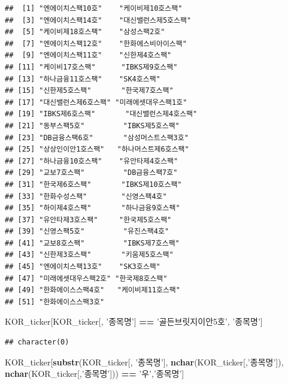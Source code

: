 \documentclass[12pt,]{book}
\newenvironment{Shaded}{\begin{snugshade}}{\end{snugshade}}
\newcommand{\KeywordTok}[1]{\textcolor[rgb]{0.13,0.29,0.53}{\textbf{#1}}}
\newcommand{\NormalTok}[1]{#1}
\newcommand{\OperatorTok}[1]{\textcolor[rgb]{0.81,0.36,0.00}{\textbf{#1}}}
\newcommand{\StringTok}[1]{\textcolor[rgb]{0.31,0.60,0.02}{#1}}
\begin{document}
\begin{verbatim}
##  [1] "엔에이치스팩10호"    "케이비제10호스팩"   
##  [3] "엔에이치스팩14호"    "대신밸런스제5호스팩"
##  [5] "케이비제18호스팩"    "삼성스팩2호"        
##  [7] "엔에이치스팩12호"    "한화에스비아이스팩" 
##  [9] "엔에이치스팩11호"    "신한제4호스팩"      
## [11] "케이비17호스팩"      "IBKS제9호스팩"      
## [13] "하나금융11호스팩"    "SK4호스팩"          
## [15] "신한제5호스팩"       "한국제7호스팩"      
## [17] "대신밸런스제6호스팩" "미래에셋대우스팩1호"
## [19] "IBKS제6호스팩"       "대신밸런스제4호스팩"
## [21] "동부스팩5호"         "IBKS제5호스팩"      
## [23] "DB금융스팩6호"       "삼성머스트스팩3호"  
## [25] "상상인이안1호스팩"   "하나머스트제6호스팩"
## [27] "하나금융10호스팩"    "유안타제4호스팩"    
## [29] "교보7호스팩"         "DB금융스팩7호"      
## [31] "한국제6호스팩"       "IBKS제10호스팩"     
## [33] "한화수성스팩"        "신영스팩4호"        
## [35] "하이제4호스팩"       "하나금융9호스팩"    
## [37] "유안타제3호스팩"     "한국제5호스팩"      
## [39] "신영스팩5호"         "유진스팩4호"        
## [41] "교보8호스팩"         "IBKS제7호스팩"      
## [43] "신한제3호스팩"       "키움제5호스팩"      
## [45] "엔에이치스팩13호"    "SK3호스팩"          
## [47] "미래에셋대우스팩2호" "한국제8호스팩"      
## [49] "한화에이스스팩4호"   "케이비제11호스팩"   
## [51] "한화에이스스팩3호"
\end{verbatim}

\begin{Shaded}
\begin{Highlighting}[]
\NormalTok{KOR_ticker[KOR_ticker[, }\StringTok{'종목명'}\NormalTok{] }\OperatorTok{==}\StringTok{ '골든브릿지이안5호'}\NormalTok{, }\StringTok{'종목명'}\NormalTok{]}
\end{Highlighting}
\end{Shaded}

\begin{verbatim}
## character(0)
\end{verbatim}

\begin{Shaded}
\begin{Highlighting}[]
\NormalTok{KOR_ticker[}\KeywordTok{substr}\NormalTok{(KOR_ticker[, }\StringTok{'종목명'}\NormalTok{],}
                  \KeywordTok{nchar}\NormalTok{(KOR_ticker[,}\StringTok{'종목명'}\NormalTok{]),}
                  \KeywordTok{nchar}\NormalTok{(KOR_ticker[,}\StringTok{'종목명'}\NormalTok{])) }\OperatorTok{==}\StringTok{ '우'}\NormalTok{,}\StringTok{'종목명'}\NormalTok{]}
\end{Highlighting}
\end{Shaded}
\end{document}

